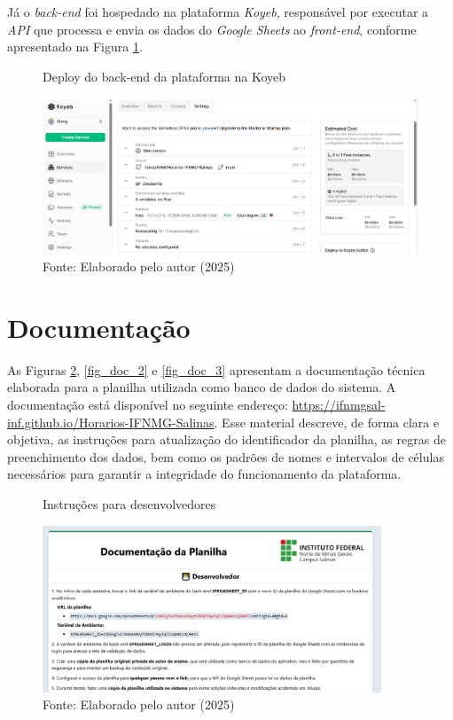 Já o \textit{back-end} foi hospedado na plataforma \textit{Koyeb}, responsável por executar a \textit{API} que processa e envia os dados do \textit{Google Sheets} ao \textit{front-end}, conforme apresentado na Figura \ref{fig_deploy_2}.

\begin{figure}[htb]
    \centering
    \caption{Deploy do back-end da plataforma na Koyeb}
    \includegraphics[width=1\textwidth]{Figuras/deploy-2.png}
    \caption*{Fonte: Elaborado pelo autor (2025)}
    \label{fig_deploy_2}
\end{figure}

\section{Documentação}

As Figuras \ref{fig_doc_1}, \ref{fig_doc_2} e \ref{fig_doc_3} apresentam a documentação técnica elaborada para a planilha utilizada como banco de dados do sistema. A documentação está disponível no seguinte endereço: \url{https://ifnmgsal-inf.github.io/Horarios-IFNMG-Salinas}. Esse material descreve, de forma clara e objetiva, as instruções para atualização do identificador da planilha, as regras de preenchimento dos dados, bem como os padrões de nomes e intervalos de células necessários para garantir a integridade do funcionamento da plataforma.

\begin{figure}[htb]
    \centering
    \caption{Instruções para desenvolvedores}
    \includegraphics[width=0.9\textwidth]{Figuras/doc-1.png}
    \caption*{Fonte: Elaborado pelo autor (2025)}
    \label{fig_doc_1}
\end{figure}

